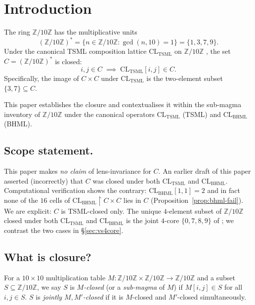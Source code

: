 \documentclass[11pt,reqno]{amsart}
\theoremstyle{plain}
\theoremstyle{definition}
\theoremstyle{remark}
\newcommand{\Z}{\mathbb{Z}}
\newcommand{\TSML}{\mathrm{TSML}}
\newcommand{\BHML}{\mathrm{BHML}}
\begin{document}
\section{Introduction}

The ring $\Z/10\Z$ has the multiplicative units
\[
(\Z/10\Z)^* = \{n \in \Z/10\Z : \gcd(n, 10) = 1\}
= \{1, 3, 7, 9\}.
\]
Under the canonical TSML composition lattice $\mathrm{CL}_\TSML$ on
$\Z/10\Z$ \cite{SandersForcing}, the set $C = (\Z/10\Z)^*$ is closed:
\[
i, j \in C \;\implies\; \mathrm{CL}_\TSML[i, j] \in C.
\]
Specifically, the image of $C \times C$ under $\mathrm{CL}_\TSML$ is the
two-element subset $\{3, 7\} \subseteq C$.

This paper establishes the closure and contextualises it within the
sub-magma inventory of $\Z/10\Z$ under the canonical operators
$\mathrm{CL}_\TSML$ (TSML) and $\mathrm{CL}_\BHML$ (BHML).

\subsection{Scope statement.}
This paper makes \emph{no claim} of lens-invariance for $C$.  An earlier
draft of this paper asserted (incorrectly) that $C$ was closed under
both $\mathrm{CL}_\TSML$ and $\mathrm{CL}_\BHML$.  Computational
verification shows the contrary: $\mathrm{CL}_\BHML[1, 1] = 2$ and in
fact none of the $16$ cells of
$\mathrm{CL}_\BHML \restriction C \times C$ lies in $C$
(Proposition~\ref{prop:bhml-fail}).  We are explicit: $C$ is
TSML-closed only.  The unique $4$-element subset of $\Z/10\Z$ closed
under both $\mathrm{CL}_\TSML$ and $\mathrm{CL}_\BHML$ is the joint
$4$-core $\{0, 7, 8, 9\}$ of \cite{SandersGishFourCore}; we contrast
the two cases in \S\ref{sec:vs4core}.

\subsection{What is closure?}
For a $10 \times 10$ multiplication table $M : \Z/10\Z \times \Z/10\Z
\to \Z/10\Z$ and a subset $S \subseteq \Z/10\Z$, we say $S$ is
\emph{$M$-closed} (or a \emph{sub-magma} of $M$) if $M[i, j] \in S$
for all $i, j \in S$.  $S$ is \emph{jointly $M, M'$-closed} if it is
$M$-closed and $M'$-closed simultaneously.
\end{document}
